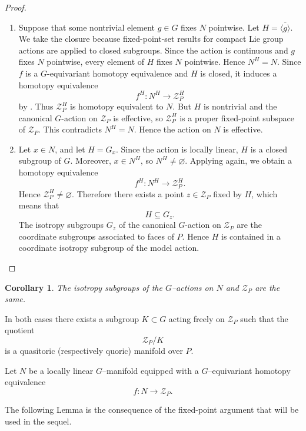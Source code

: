\documentclass[11pt,a4paper]{article}
\numberwithin{equation}{section}
\newtheorem{cor}[definition]{Corollary}
\theoremstyle{named}
\begin{document}
\begin{proof}
\begin{enumerate}
\item[(1)]
Suppose that some nontrivial element \(g\in G\) fixes \(N\) pointwise. Let \(H=\overline{\langle g\rangle}.\) We take the closure because fixed-point-set results for compact Lie group actions are applied to closed subgroups. Since the action is continuous and \(g\) fixes \(N\) pointwise, every element of \(H\) fixes \(N\) pointwise. Hence \(N^H=N.\) Since \(f\) is a \(G\)-equivariant homotopy equivalence and \(H\) is closed, it induces a homotopy equivalence
\[
f^H:N^H\longrightarrow \mathcal Z_P^H
\]
by \cite[Cor.~II.5.5]{bredon}. Thus \(\mathcal Z_P^H\) is homotopy equivalent to \(N\). But \(H\) is nontrivial and the canonical \(G\)-action on \(\mathcal Z_P\) is effective, so \(\mathcal Z_P^H\) is a proper fixed-point subspace of \(\mathcal Z_P\). This contradicts \(N^H=N\). Hence the action on \(N\) is effective.

\item[(2)]
Let \(x\in N\), and let \(H=G_x\). Since the action is locally linear, \(H\) is a closed subgroup of \(G\). Moreover, \(x\in N^H\), so \(N^H\neq\varnothing\). Applying \cite[Cor.~II.5.5]{bredon} again, we obtain a homotopy equivalence
\[
f^H:N^H\longrightarrow \mathcal Z_P^H.
\]
Hence \(\mathcal Z_P^H\neq\varnothing\). Therefore there exists a point \(z\in \mathcal Z_P\) fixed by \(H\), which means that
\[
    H\subseteq G_z.
\]
The isotropy subgroups \(G_z\) of the canonical \(G\)-action on \(\mathcal Z_P\) are the coordinate subgroups associated to faces of \(P\). Hence \(H\) is contained in a coordinate isotropy subgroup of the model action.
\end{enumerate}
\end{proof}

\begin{cor}\label{cor:isotropy_equal}
The isotropy subgroups of the $G$--actions on $N$ and $\mathcal Z_P$ are the same.
\end{cor}

\medskip

In both cases there exists a subgroup $K \subset G$ acting freely on $\mathcal Z_P$ such that the quotient
\[
\mathcal Z_P/K
\]
is a quasitoric (respectively quoric) manifold over $P$.

Let $N$ be a locally linear $G$--manifold equipped with a $G$--equivariant homotopy equivalence
\[
f:N\longrightarrow \mathcal Z_P .
\]

The following Lemma is the consequence of the fixed-point argument that will be used in the sequel.
\end{document}
